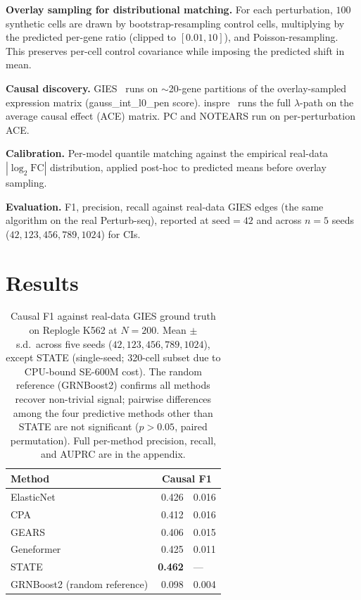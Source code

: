 \documentclass{article}
\begin{document}
\textbf{Overlay sampling for distributional matching.} For each perturbation, $100$ synthetic cells are drawn by bootstrap-resampling control cells, multiplying by the predicted per-gene ratio (clipped to $[0.01, 10]$), and Poisson-resampling. This preserves per-cell control covariance while imposing the predicted shift in mean.

\textbf{Causal discovery.} GIES~\citep{hauser2012gies} runs on $\sim$20-gene partitions of the overlay-sampled expression matrix (gauss\_int\_l0\_pen score). inspre~\citep{brown2025inspre} runs the full $\lambda$-path on the average causal effect (ACE) matrix. PC and NOTEARS run on per-perturbation ACE.

\textbf{Calibration.} Per-model quantile matching against the empirical real-data $|\log_2 \text{FC}|$ distribution, applied post-hoc to predicted means before overlay sampling.

\textbf{Evaluation.} F1, precision, recall against real-data GIES edges (the same algorithm on the real Perturb-seq), reported at $\text{seed}=42$ and across $n=5$ seeds ($42, 123, 456, 789, 1024$) for CIs.

\section{Results}
\label{sec:results}

\begin{table}[t]
\centering
\small
\begin{tabular}{lr@{$\,\pm\,$}l}
\toprule
\textbf{Method} & \multicolumn{2}{c}{\textbf{Causal F1}} \\
\midrule
ElasticNet        & 0.426 & 0.016 \\
CPA               & 0.412 & 0.016 \\
GEARS             & 0.406 & 0.015 \\
Geneformer        & 0.425 & 0.011 \\
STATE             & \textbf{0.462} & \hspace{-3pt}--- \\
\midrule
GRNBoost2 (random reference) & 0.098 & 0.004 \\
\bottomrule
\end{tabular}
\caption{Causal F1 against real-data GIES ground truth on Replogle K562 at $N{=}200$. Mean $\pm$ s.d.\ across five seeds ($42, 123, 456, 789, 1024$), except STATE (single-seed; 320-cell subset due to CPU-bound SE-600M cost). The random reference (GRNBoost2) confirms all methods recover non-trivial signal; pairwise differences among the four predictive methods other than STATE are not significant ($p > 0.05$, paired permutation). Full per-method precision, recall, and AUPRC are in the appendix.}
\label{tab:main}
\end{table}
\end{document}
